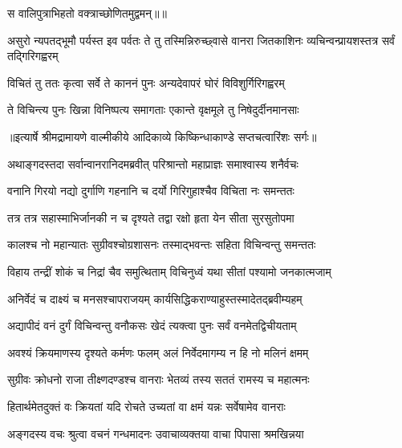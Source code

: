 \addtocounter{shlokacount}{1}

{स वालिपुत्राभिहतो वक्त्राच्छोणितमुद्वमन्॥॥} %

\addtocounter{shlokacount}{1}

\threelineshloka
{असुरो न्यपतद्भूमौ पर्यस्त इव पर्वतः}
{ते तु तस्मिन्निरुच्छ्वासे वानरा जितकाशिनः}
{व्यचिन्वन्प्रायशस्तत्र सर्वं तद्गिरिगह्वरम्} %

\twolineshloka
{विचितं तु ततः कृत्वा सर्वे ते काननं पुनः}
{अन्यदेवापरं घोरं विविशुर्गिरिगह्वरम्} %

\twolineshloka
{ते विचिन्त्य पुनः खिन्ना विनिष्पत्य समागताः}
{एकान्ते वृक्षमूले तु निषेदुर्दीनमानसाः} %


{॥इत्यार्षे श्रीमद्रामायणे वाल्मीकीये आदिकाव्ये किष्किन्धाकाण्डे सप्तचत्वारिंशः सर्गः॥}


\twolineshloka
{अथाङ्गदस्तदा सर्वान्वानरानिदमब्रवीत्}
{परिश्रान्तो महाप्राज्ञः समाश्वास्य शनैर्वचः} %

\twolineshloka
{वनानि गिरयो नद्यो दुर्गाणि गहनानि च}
{दर्यो गिरिगुहाश्चैव विचिता नः समन्ततः} %

\twolineshloka
{तत्र तत्र सहास्माभिर्जानकी न च दृश्यते}
{तद्वा रक्षो हृता येन सीता सुरसुतोपमा} %

\twolineshloka
{कालश्च नो महान्यातः सुग्रीवश्चोग्रशासनः}
{तस्माद्भवन्तः सहिता विचिन्वन्तु समन्ततः} %

\twolineshloka
{विहाय तन्द्रीं शोकं च निद्रां चैव समुत्थिताम्}
{विचिनुध्वं यथा सीतां पश्यामो जनकात्मजाम्} %

\twolineshloka
{अनिर्वेदं च दाक्ष्यं च मनसश्चापराजयम्}
{कार्यसिद्धिकराण्याहुस्तस्मादेतद्ब्रवीम्यहम्} %

\twolineshloka
{अद्यापीदं वनं दुर्गं विचिन्वन्तु वनौकसः}
{खेदं त्यक्त्वा पुनः सर्वं वनमेतद्विचीयताम्} %

\twolineshloka
{अवश्यं क्रियमाणस्य दृश्यते कर्मणः फलम्}
{अलं निर्वेदमागम्य न हि नो मलिनं क्षमम्} %

\twolineshloka
{सुग्रीवः क्रोधनो राजा तीक्ष्णदण्डश्च वानराः}
{भेतव्यं तस्य सततं रामस्य च महात्मनः} %

\twolineshloka
{हितार्थमेतदुक्तं वः क्रियतां यदि रोचते}
{उच्यतां वा क्षमं यन्नः सर्वेषामेव वानराः} %

\twolineshloka
{अङ्गदस्य वचः श्रुत्वा वचनं गन्धमादनः}
{उवाचाव्यक्तया वाचा पिपासा श्रमखिन्नया} %

